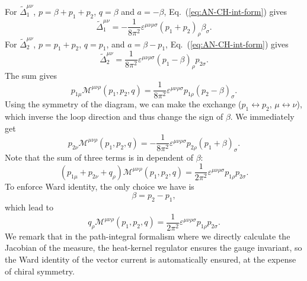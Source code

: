 For $\tilde\Delta_{1}^{\mu\nu}$, $p=\beta+p_1+p_2$, $q=\beta$ and $a=-\beta$, Eq.~(\ref{eq:AN-CH-int-form}) gives
\begin{equation}
	\tilde\Delta^{\mu\nu}_1 = -\frac{1}{8\pi^2} \varepsilon^{\mu\nu\rho\sigma} (p_1+p_2)_\rho \beta_{\sigma}.
\end{equation}
For $\tilde\Delta_2^{\mu\nu}$, $p=p_1+p_2$, $q=p_1$, and $a=\beta-p_1$, Eq.~(\ref{eq:AN-CH-int-form}) gives
\begin{equation}
	\tilde\Delta^{\mu\nu}_2 = \frac{1}{8\pi^2} \varepsilon^{\mu\nu\rho\sigma} (p_1-\beta)_\rho p_{2\sigma}.
\end{equation}
The sum gives
\begin{equation}
	p_{1\mu} \mathcal{M}^{\mu\nu\rho}(p_1,p_2,q) = \frac{1}{8\pi^2} \varepsilon^{\mu\nu\rho\sigma} p_{1\rho}(p_{2}-\beta)_\sigma.
\end{equation}
Using the symmetry of the diagram, we can make the exchange ($p_1 \leftrightarrow p_2$, $\mu \leftrightarrow \nu$), which inverse the loop direction and thus change the sign of $\beta$.
We immediately get
\begin{equation}
	p_{2\nu} \mathcal{M}^{\mu\nu\rho}(p_1,p_2,q) = -\frac{1}{8\pi^2} \varepsilon^{\mu\nu\rho\sigma} p_{2\rho}(p_{1}+\beta)_\sigma.
\end{equation}
Note that the sum of three terms is in dependent of $\beta$:
\begin{equation}
	(p_{1\mu}+p_{2\nu}+q_{\rho}) \mathcal M^{\mu\nu\rho}(p_1,p_2,q) = \frac{1}{2\pi^2} \varepsilon^{\mu\nu\rho\sigma} p_{1\rho} p_{2\sigma}.
\end{equation}
To enforce Ward identity, the only choice we have is
\begin{equation}
	\beta = p_2-p_1,
\end{equation}
which lead to
\begin{equation}
	q_\rho \mathcal{M}^{\mu\nu\rho}(p_1,p_2,q) = \frac{1}{2\pi^2} \varepsilon^{\mu\nu\rho\sigma} p_{1\rho} p_{2\sigma}.
\end{equation}
We remark that in the path-integral formalism where we directly calculate the Jacobian of the measure, the heat-kernel regulator ensures the gauge invariant, so the Ward identity of the vector current is automatically ensured, at the expense of chiral symmetry.

